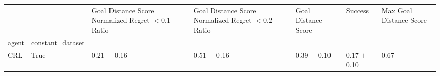 \begin{tabular}{lllllll}
\toprule
 &  & Goal Distance Score Normalized Regret $< 0.1$ Ratio & Goal Distance Score Normalized Regret $< 0.2$ Ratio & Goal Distance Score & Success & Max Goal Distance Score \\
agent & constant_dataset &  &  &  &  &  \\
\midrule
CRL & True & 0.21 $\pm$ 0.16 & 0.51 $\pm$ 0.16 & 0.39 $\pm$ 0.10 & 0.17 $\pm$ 0.10 & 0.67 \\
\cline{1-7}
\bottomrule
\end{tabular}
